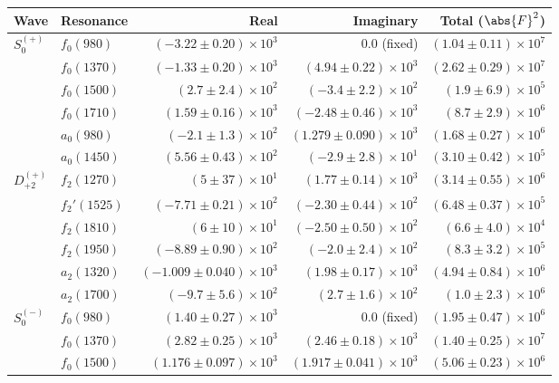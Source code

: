 \begin{table}
    \begin{center}
        \begin{tabular}{llrrr}\toprule
        Wave & Resonance & Real & Imaginary & Total ($\abs{F}^2$) \\\midrule
$S_{0}^{(+)}$ & $f_{0}(980)$ & $(-3.22 \pm 0.20) \times 10^{3}$ & $0.0$ (fixed) & $(1.04 \pm 0.11) \times 10^{7}$ \\
 & $f_{0}(1370)$ & $(-1.33 \pm 0.20) \times 10^{3}$ & $(4.94 \pm 0.22) \times 10^{3}$ & $(2.62 \pm 0.29) \times 10^{7}$ \\
 & $f_{0}(1500)$ & $(2.7 \pm 2.4) \times 10^{2}$ & $(-3.4 \pm 2.2) \times 10^{2}$ & $(1.9 \pm 6.9) \times 10^{5}$ \\
 & $f_{0}(1710)$ & $(1.59 \pm 0.16) \times 10^{3}$ & $(-2.48 \pm 0.46) \times 10^{3}$ & $(8.7 \pm 2.9) \times 10^{6}$ \\
 & $a_{0}(980)$ & $(-2.1 \pm 1.3) \times 10^{2}$ & $(1.279 \pm 0.090) \times 10^{3}$ & $(1.68 \pm 0.27) \times 10^{6}$ \\
 & $a_{0}(1450)$ & $(5.56 \pm 0.43) \times 10^{2}$ & $(-2.9 \pm 2.8) \times 10^{1}$ & $(3.10 \pm 0.42) \times 10^{5}$ \\
$D_{+2}^{(+)}$ & $f_{2}(1270)$ & $(5 \pm 37) \times 10^{1}$ & $(1.77 \pm 0.14) \times 10^{3}$ & $(3.14 \pm 0.55) \times 10^{6}$ \\
 & $f_{2}'(1525)$ & $(-7.71 \pm 0.21) \times 10^{2}$ & $(-2.30 \pm 0.44) \times 10^{2}$ & $(6.48 \pm 0.37) \times 10^{5}$ \\
 & $f_{2}(1810)$ & $(6 \pm 10) \times 10^{1}$ & $(-2.50 \pm 0.50) \times 10^{2}$ & $(6.6 \pm 4.0) \times 10^{4}$ \\
 & $f_{2}(1950)$ & $(-8.89 \pm 0.90) \times 10^{2}$ & $(-2.0 \pm 2.4) \times 10^{2}$ & $(8.3 \pm 3.2) \times 10^{5}$ \\
 & $a_{2}(1320)$ & $(-1.009 \pm 0.040) \times 10^{3}$ & $(1.98 \pm 0.17) \times 10^{3}$ & $(4.94 \pm 0.84) \times 10^{6}$ \\
 & $a_{2}(1700)$ & $(-9.7 \pm 5.6) \times 10^{2}$ & $(2.7 \pm 1.6) \times 10^{2}$ & $(1.0 \pm 2.3) \times 10^{6}$ \\
$S_{0}^{(-)}$ & $f_{0}(980)$ & $(1.40 \pm 0.27) \times 10^{3}$ & $0.0$ (fixed) & $(1.95 \pm 0.47) \times 10^{6}$ \\
 & $f_{0}(1370)$ & $(2.82 \pm 0.25) \times 10^{3}$ & $(2.46 \pm 0.18) \times 10^{3}$ & $(1.40 \pm 0.25) \times 10^{7}$ \\
 & $f_{0}(1500)$ & $(1.176 \pm 0.097) \times 10^{3}$ & $(1.917 \pm 0.041) \times 10^{3}$ & $(5.06 \pm 0.23) \times 10^{6}$ \\

\end{tabular}
\end{center}
\end{table}
